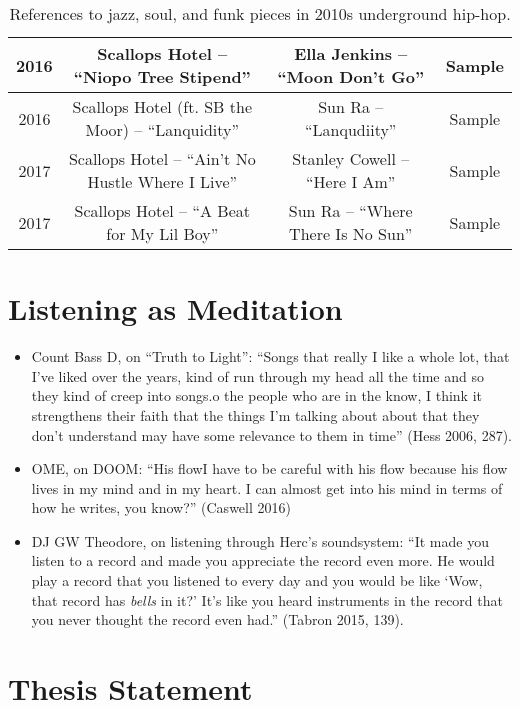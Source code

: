 \begin{sidewaystable}[p]
\begin{tabular}{|c|c|c|c|}
        2016 & Scallops Hotel -- ``Niopo Tree Stipend'' & Ella Jenkins -- ``Moon Don't Go'' & Sample \\ \hline
        2016 & Scallops Hotel (ft. SB the Moor) -- ``Lanquidity'' & Sun Ra -- ``Lanqudiity'' & Sample \\ \hline
        2017 & Scallops Hotel -- ``Ain't No Hustle Where I Live'' & Stanley Cowell -- ``Here I Am'' & Sample \\ \hline
        2017 & Scallops Hotel -- ``A Beat for My Lil Boy'' & Sun Ra -- ``Where There Is No Sun'' & Sample \\ \hline
    \end{tabular}
    \caption{References to jazz, soul, and funk pieces in 2010s underground hip-hop.}
    \label{tab:jazz_references}
\end{sidewaystable}

\section{Listening as Meditation}

\begin{itemize}
    \item Count Bass D, on ``Truth to Light'': ``Songs that really I like a whole lot, that I've liked over the years, kind of run through my head all the time and so they kind of creep into songs.\textellipsis [T]o the people who are in the know, I think it strengthens their faith that the things I'm talking about about that they don't understand may have some relevance to them in time'' (Hess 2006, 287).
    \item OME, on DOOM: ``His flow\textemdash I have to be careful with his flow because his flow lives in my mind and in my heart. I can almost get into his mind in terms of how he writes, you know?'' (Caswell 2016)
    \item DJ GW Theodore, on listening through Herc's soundsystem: ``It made you listen to a record and made you appreciate the record even more. He would play a record that you listened to every day and you would be like `Wow, that record has \emph{bells} in it?' It's like you heard instruments in the record that you never thought the record even had.'' (Tabron 2015, 139).
\end{itemize}

\section{Thesis Statement}

